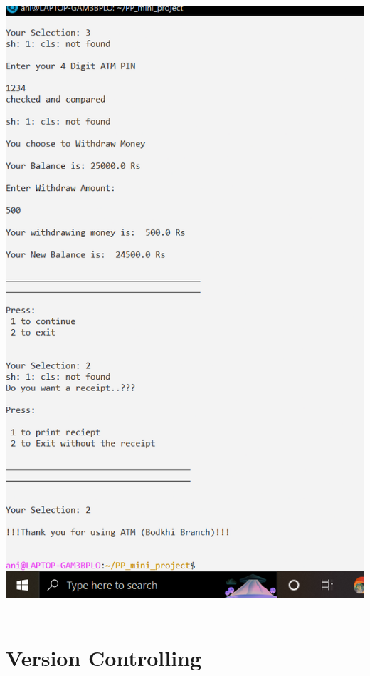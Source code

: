 \documentclass{article}
\begin{document}
\includegraphics[scale=0.35]{output_py_3.png}  \\ \\

\section{Version Controlling}
\end{document}
